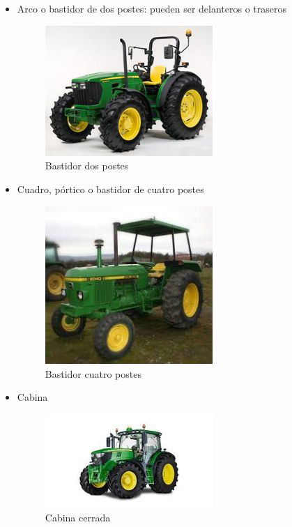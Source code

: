\documentclass[a4paper,12pt,oneside]{book}
\begin{document}
\begin{itemize}
\item Arco o bastidor de dos postes: pueden ser delanteros o traseros
\begin{figure}[htbp]
\centering
\includegraphics[width=0.6\textwidth]{./img_0009/bastidor2p.jpeg}
\caption{Bastidor dos postes}
\end{figure}

\item Cuadro, pórtico o bastidor de cuatro postes
\begin{figure}[htbp]
\centering
\includegraphics[width=0.6\textwidth]{./img_0009/bastidor4p.jpg}
\caption{Bastidor cuatro postes}
\end{figure}

\item Cabina
\begin{figure}[htbp]
\centering
\includegraphics[width=0.6\textwidth]{./img_0009/cabina.jpg}
\caption{Cabina cerrada}
\end{figure}
\end{itemize}
\end{document}
